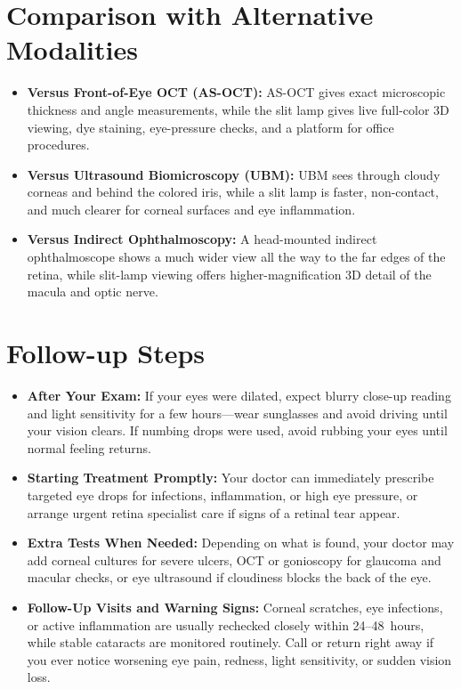 \section{Comparison with Alternative Modalities}

\begin{itemize}
    \item \textbf{Versus Front-of-Eye OCT (AS-OCT):} AS-OCT gives exact microscopic thickness and angle measurements, while the slit lamp gives live full-color 3D viewing, dye staining, eye-pressure checks, and a platform for office procedures.
    \item \textbf{Versus Ultrasound Biomicroscopy (UBM):} UBM sees through cloudy corneas and behind the colored iris, while a slit lamp is faster, non-contact, and much clearer for corneal surfaces and eye inflammation.
    \item \textbf{Versus Indirect Ophthalmoscopy:} A head-mounted indirect ophthalmoscope shows a much wider view all the way to the far edges of the retina, while slit-lamp viewing offers higher-magnification 3D detail of the macula and optic nerve.
\end{itemize}

\section{Follow-up Steps}

\begin{itemize}
    \item \textbf{After Your Exam:} If your eyes were dilated, expect blurry close-up reading and light sensitivity for a few hours---wear sunglasses and avoid driving until your vision clears. If numbing drops were used, avoid rubbing your eyes until normal feeling returns.
    \item \textbf{Starting Treatment Promptly:} Your doctor can immediately prescribe targeted eye drops for infections, inflammation, or high eye pressure, or arrange urgent retina specialist care if signs of a retinal tear appear.
    \item \textbf{Extra Tests When Needed:} Depending on what is found, your doctor may add corneal cultures for severe ulcers, OCT or gonioscopy for glaucoma and macular checks, or eye ultrasound if cloudiness blocks the back of the eye.
    \item \textbf{Follow-Up Visits and Warning Signs:} Corneal scratches, eye infections, or active inflammation are usually rechecked closely within 24--48~hours, while stable cataracts are monitored routinely. Call or return right away if you ever notice worsening eye pain, redness, light sensitivity, or sudden vision loss.
\end{itemize}

